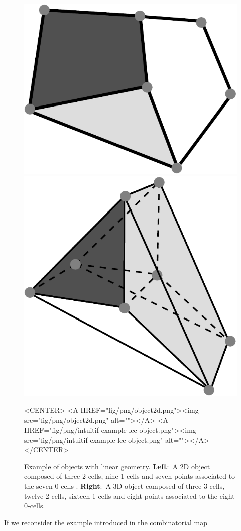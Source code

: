 \begin{figure}[ht]
  \begin{ccTexOnly}
    \begin{center}
      \includegraphics[width=.35\textwidth]
      {Linear_cell_complex/fig/pdf/object2d}
      \qquad
      \includegraphics[width=.45\textwidth]
      {Linear_cell_complex/fig/pdf/intuitif-example-lcc-object}
    \end{center}
  \end{ccTexOnly}
  \begin{ccHtmlOnly}
    <CENTER>
    <A HREF="fig/png/object2d.png"><img src="fig/png/object2d.png" alt=""></A>
    <A HREF="fig/png/intuitif-example-lcc-object.png"><img src="fig/png/intuitif-example-lcc-object.png" alt=""></A>
    </CENTER>
    \end{ccHtmlOnly}
    \caption{Example of objects with linear geometry. \textbf{Left}:~A
      2D object composed of three 2-cells, nine
      1-cells and seven points associated to the seven 0-cells .   
      \textbf{Right}:~A
      3D object composed of three 3-cells, twelve 2-cells, sixteen
      1-cells and eight points associated to the eight 0-cells.
      \label{fig-exemple-introductif}}
\end{figure}
%
If we reconsider the example introduced in the combinatorial map
